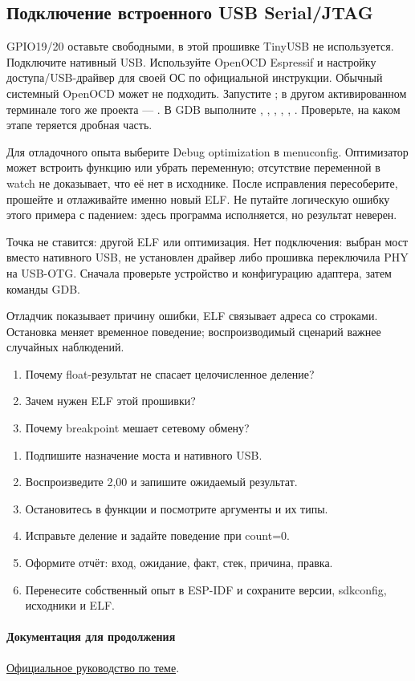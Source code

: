 \subsection{Подключение встроенного USB Serial/JTAG}
GPIO19/20 оставьте свободными, в этой прошивке TinyUSB не используется.
Подключите нативный USB. Используйте OpenOCD Espressif и настройку доступа/USB-драйвер
для своей ОС по официальной инструкции. Обычный системный OpenOCD может не подходить.
Запустите ; в другом активированном терминале того же проекта --- .
В GDB выполните , , , ,
, . Проверьте, на каком этапе теряется дробная часть.

Для отладочного опыта выберите Debug optimization в menuconfig. Оптимизатор может встроить
функцию или убрать переменную; отсутствие переменной в watch не доказывает, что её нет в исходнике.
После исправления пересоберите, прошейте и отлаживайте именно новый ELF. Не путайте логическую
ошибку этого примера с падением: здесь программа исполняется, но результат неверен.

\begin{trouble}
Точка не ставится: другой ELF или оптимизация. Нет подключения: выбран мост вместо нативного USB,
не установлен драйвер либо прошивка переключила PHY на USB-OTG. Сначала проверьте устройство
и конфигурацию адаптера, затем команды GDB.
\end{trouble}
\begin{summary}
Отладчик показывает причину ошибки, ELF связывает адреса со строками.
Остановка меняет временное поведение; воспроизводимый сценарий важнее случайных наблюдений.
\end{summary}

\begin{selfcheck}
\begin{enumerate}
\item Почему float-результат не спасает целочисленное деление?
\item Зачем нужен ELF этой прошивки?
\item Почему breakpoint мешает сетевому обмену?
\end{enumerate}
\end{selfcheck}
\begin{tasks}
\begin{enumerate}
\item {} Подпишите назначение моста и нативного USB.
\item {} Воспроизведите 2,00 и запишите ожидаемый результат.
\item {} Остановитесь в функции и посмотрите аргументы и их типы.
\item {} Исправьте деление и задайте поведение при count=0.
\item {} Оформите отчёт: вход, ожидание, факт, стек, причина, правка.
\item {} Перенесите собственный опыт в ESP-IDF и сохраните версии, sdkconfig, исходники и ELF.
\end{enumerate}
\end{tasks}

\paragraph{Документация для продолжения}\href{https://docs.espressif.com/projects/esp-idf/en/v5.4/esp32s3/api-guides/jtag-debugging/index.html}{Официальное руководство по теме}.
